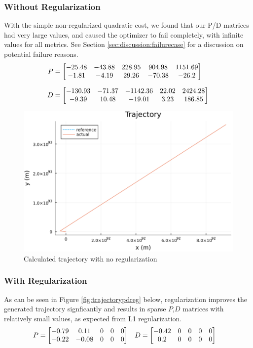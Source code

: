 \documentclass[11pt]{article}
\begin{document}
    \pagebreak
    
    \subsubsection{Without Regularization} \label{sec:results:singletraj:noreg}
    With the simple non-regularized quadratic cost, we found that our P/D matrices had very large values, and caused the optimizer to fail completely, with infinite values for all metrics. See Section \ref{sec:discussion:failurecase} for a discussion on potential failure reasons.
        \begin{align*}
            \hspace{-2em}
            P &= \bmat{-25.48 & -43.88 & 228.95 & 904.98 & 1151.69 \\
                -1.81 & -4.19 & 29.26 & -70.38 & -26.2} \fracln 
            D &
            = \bmat{-130.93 & -71.37 & -1142.36 & 22.02 & 2424.28 \\
                -9.39 & 10.48  & -19.01 & 3.23 & 186.85}
        \end{align*}
    
    \begin{figure}[h!]
        \centering
        \includegraphics[width=0.6\linewidth]{img/trajectory_pd_noreg}
        \caption{Calculated trajectory with no regularization}
        \label{fig:trajectorypdnoreg}
    \end{figure}
    
    \pagebreak
    
    \subsubsection{With Regularization} \label{sec:results:singletraj:wreg}
    As can be seen in Figure \ref{fig:trajectorypdreg} below, regularization improves the generated trajectory signficantly and results in sparse $P $,$ D$ matrices with relatively small values, as expected from L1 regularization. 
        \begin{align*}
            P &= \begin{bmatrix}-0.79 & 0.11 & 0 & 0 & 0 \\ -0.22 & -0.08 & 0 & 0 & 0\end{bmatrix} &
            D &= \begin{bmatrix}-0.42 & 0 & 0 & 0 & 0 \\  0.2 & 0 & 0 & 0 & 0\end{bmatrix}
        \end{align*}
    
\end{document}
